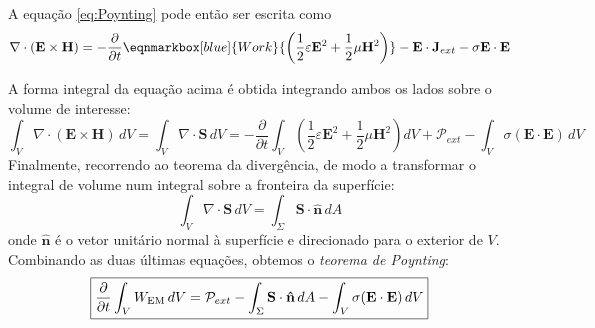 A equação \eqref{eq:Poynting} pode então ser escrita como
\begin{equation}
    \nabla \cdot (\mathbf{E} \times \mathbf{H}) = -\frac{\partial}{\partial t} \eqnmarkbox[blue]{Work}{\left( \frac{1}{2} \varepsilon \mathbf{E}^2 + \frac{1}{2} \mu \mathbf{H}^2 \right)} -\mathbf{E} \cdot \mathbf{J}_{ext} - \sigma \mathbf{E} \cdot \mathbf{E}
\end{equation}

A forma integral da equação acima é obtida integrando ambos os lados sobre o volume de interesse:
\begin{equation}
    \int_V \nabla\cdot(\mathbf{E} \times \mathbf{H}) \, dV =\int_V \nabla\cdot \mathbf{S} \, dV = -\frac{\partial}{\partial t} \int_V \left( \frac{1}{2} \varepsilon \mathbf{E}^2 + \frac{1}{2} \mu \mathbf{H}^2 \right) dV + \mathcal{P}_{ext} - \int_V \sigma (\mathbf{E} \cdot \mathbf{E}) \, dV
\end{equation}
Finalmente, recorrendo ao teorema da divergência, de modo a transformar o integral de volume num integral sobre a fronteira da superfície:
\begin{equation}
    \int_{V} \nabla \cdot \mathbf{S} \, dV = \int_{\Sigma} \mathbf{S} \cdot \mathbf{\hat{n}} \, dA
\end{equation}
onde $\mathbf{\hat{n}}$ é o vetor unitário normal à superfície e direcionado para o exterior de $V$. Combinando as duas últimas equações, obtemos o \textit{teorema de Poynting}:
\begin{equation}
        \boxed{%
            \frac{\partial}{\partial t} \int_{V} W_{\text{EM}} \, dV
            =
            \mathcal{P}_{ext} 
            - \int_{\Sigma} \mathbf{S} \cdot \mathbf{\hat{n}} \, dA 
            - \int_V \sigma (\mathbf{E} \cdot \mathbf{E}) \, dV
        }
\end{equation}
